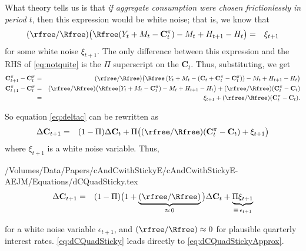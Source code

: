What theory tells us is that {\it if aggregate consumption were chosen
frictionlessly in period $t$}, then this expression would be white
noise; that is, we know that
\begin{eqnarray}
        (\rfree/\Rfree)\big(\Rfree(Y_{t}+ M_{t}-\mathbf{C}_{t}^{{\pi}})-M_{t}+H_{t+1}-H_{t}\big) & = & \xi_{t+1}  \nonumber
\end{eqnarray}
for some white noise $\xi_{t+1}$.  The only difference between this expression
and the RHS of \eqref{eq:notquite} is the $\Pi$ superscript on the
$\mathbf{C}_{t}$.  Thus, substituting, we get
\begin{eqnarray}
        \mathbf{C}_{t+1}^{{\pi}}-\mathbf{C}_{t}^{{\pi}} & = & (\rfree/\Rfree)\big(\Rfree\left(Y_{t}+M_{t}-(\mathbf{C}_{t}+\mathbf{C}_{t}^{{\pi}}-\mathbf{C}_{t}^{{\pi}})\right)-M_{t}+H_{t+1}-H_{t}\big)     \nonumber
\\        \mathbf{C}_{t+1}^{{\pi}}-\mathbf{C}_{t}^{{\pi}} & = & (\rfree/\Rfree)\big(\Rfree(Y_{t}+M_{t}-\mathbf{C}_{t}^{{\pi}})-M_{t}+H_{t+1}-H_{t}\big) + (\rfree/\Rfree) (\mathbf{C}_{t}^{{\pi}}-\mathbf{C}_{t}) \nonumber
\\    & = & \xi_{t+1} + (\rfree/\Rfree) (\mathbf{C}_{t}^{{\pi}}-\mathbf{C}_{t}).  \nonumber
\end{eqnarray}

So equation \eqref{eq:deltac} can be rewritten as
\begin{eqnarray}
    \Delta \mathbf{C}_{t+1} & = & (1-\Pi)
        \Delta \mathbf{C}_{t} + \Pi \big((\rfree/\Rfree)(\mathbf{C}_{t}^{{\pi}}-\mathbf{C}_{t}) + \xi_{t+1}\big)  \nonumber
\label{eq:deltac2}
\end{eqnarray}
where $\xi _{t+1}$ is a white noise variable.
Thus,
\begin{verbatimwrite}{/Volumes/Data/Papers/cAndCwithStickyE/cAndCwithStickyE-AEJM/Equations/dCQuadSticky.tex}
\begin{eqnarray}
    \Delta \mathbf{C}_{t+1} & = & (1-\Pi)\big(1+\underbrace{(\rfree/\Rfree)}_{\approx\,0}\big) \Delta \mathbf{C}_{t} + \underbrace{\Pi \xi_{t+1}}_{\equiv\,\epsilon_{t+1}} \label{eq:dCQuadSticky}
\end{eqnarray}
\end{verbatimwrite}

for a white noise variable $\epsilon_{t+1}$, and $(\rfree/\Rfree) \approx 0$
for plausible quarterly interest rates.  \eqref{eq:dCQuadSticky}
leads directly to \eqref{eq:dCQuadStickyApprox}.
